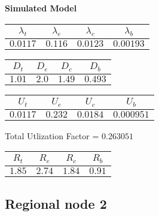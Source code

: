 \documentclass{article}
\begin{document}
\begin{minipage}{0.5\textwidth}
\centering	\textbf{Simulated Model}
\begin{table}[H]
\centering
\begin{tabular}{@{}cccc@{}}
\toprule
$\lambda_t$ & $\lambda_e$ & $\lambda_c$ & $\lambda_b$\\
\midrule
$0.0117$ & $0.116$ & $0.0123$ & $0.00193$\\
\bottomrule
\end{tabular}
\end{table}
\begin{table}[H]
\centering
\begin{tabular}{@{}cccc@{}}
\toprule
$D_t$ & $D_e$ & $D_c$ & $D_b$\\
\midrule
$1.01$ & $2.0$ & $1.49$ & $0.493$\\
\bottomrule
\end{tabular}
\end{table}\begin{table}[H]
\centering
\begin{tabular}{@{}cccc@{}}
\toprule
$U_t$ & $U_e$ & $U_c$ & $U_b$\\
\midrule
$0.0117$ & $0.232$ & $0.0184$ & $0.000951$\\
\bottomrule
\end{tabular}
\end{table}
\centering Total Utlization Factor = $0.263051$
\begin{table}[H]
\centering
\begin{tabular}{@{}cccc@{}}
\toprule
$R_t$ & $R_e$ & $R_c$ & $R_b$\\
\midrule
$1.85$ & $2.74$ & $1.84$ & $0.91$\\
\bottomrule
\end{tabular}
\end{table}
\end{minipage}\subsection{Regional node 2}
\end{document}
